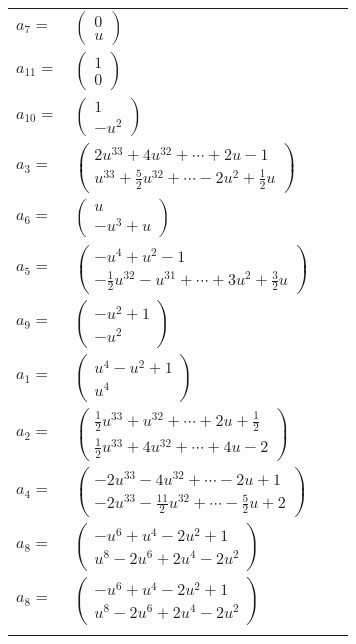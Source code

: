 \documentclass[1p]{elsarticle_modified}
\theoremstyle{definition}
\begin{document}
\begin{tabular}{m{7pt} m{180pt} m{7pt} m{180pt} }
\flushright $a_{7}=$&$\begin{pmatrix}0\\u\end{pmatrix}$ \\
\flushright $a_{11}=$&$\begin{pmatrix}1\\0\end{pmatrix}$ \\
\flushright $a_{10}=$&$\begin{pmatrix}1\\- u^2\end{pmatrix}$ \\
\flushright $a_{3}=$&$\begin{pmatrix}2 u^{33}+4 u^{32}+\cdots+2 u-1\\u^{33}+\frac{5}{2} u^{32}+\cdots-2 u^2+\frac{1}{2} u\end{pmatrix}$ \\
\flushright $a_{6}=$&$\begin{pmatrix}u\\- u^3+u\end{pmatrix}$ \\
\flushright $a_{5}=$&$\begin{pmatrix}- u^4+u^2-1\\-\frac{1}{2} u^{32}- u^{31}+\cdots+3 u^2+\frac{3}{2} u\end{pmatrix}$ \\
\flushright $a_{9}=$&$\begin{pmatrix}- u^2+1\\- u^2\end{pmatrix}$ \\
\flushright $a_{1}=$&$\begin{pmatrix}u^4- u^2+1\\u^4\end{pmatrix}$ \\
\flushright $a_{2}=$&$\begin{pmatrix}\frac{1}{2} u^{33}+u^{32}+\cdots+2 u+\frac{1}{2}\\\frac{1}{2} u^{33}+4 u^{32}+\cdots+4 u-2\end{pmatrix}$ \\
\flushright $a_{4}=$&$\begin{pmatrix}-2 u^{33}-4 u^{32}+\cdots-2 u+1\\-2 u^{33}-\frac{11}{2} u^{32}+\cdots-\frac{5}{2} u+2\end{pmatrix}$ \\
\flushright $a_{8}=$&$\begin{pmatrix}- u^6+u^4-2 u^2+1\\u^8-2 u^6+2 u^4-2 u^2\end{pmatrix}$\\ \flushright $a_{8}=$&$\begin{pmatrix}- u^6+u^4-2 u^2+1\\u^8-2 u^6+2 u^4-2 u^2\end{pmatrix}$\\&\end{tabular}
\end{document}
